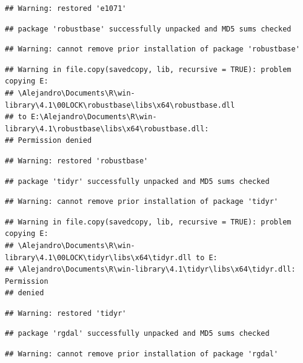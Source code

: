 \documentclass[
  10pt,
]{article}
\begin{document}
\begin{verbatim}
## Warning: restored 'e1071'
\end{verbatim}

\begin{verbatim}
## package 'robustbase' successfully unpacked and MD5 sums checked
\end{verbatim}

\begin{verbatim}
## Warning: cannot remove prior installation of package 'robustbase'
\end{verbatim}

\begin{verbatim}
## Warning in file.copy(savedcopy, lib, recursive = TRUE): problem copying E:
## \Alejandro\Documents\R\win-library\4.1\00LOCK\robustbase\libs\x64\robustbase.dll
## to E:\Alejandro\Documents\R\win-library\4.1\robustbase\libs\x64\robustbase.dll:
## Permission denied
\end{verbatim}

\begin{verbatim}
## Warning: restored 'robustbase'
\end{verbatim}

\begin{verbatim}
## package 'tidyr' successfully unpacked and MD5 sums checked
\end{verbatim}

\begin{verbatim}
## Warning: cannot remove prior installation of package 'tidyr'
\end{verbatim}

\begin{verbatim}
## Warning in file.copy(savedcopy, lib, recursive = TRUE): problem copying E:
## \Alejandro\Documents\R\win-library\4.1\00LOCK\tidyr\libs\x64\tidyr.dll to E:
## \Alejandro\Documents\R\win-library\4.1\tidyr\libs\x64\tidyr.dll: Permission
## denied
\end{verbatim}

\begin{verbatim}
## Warning: restored 'tidyr'
\end{verbatim}

\begin{verbatim}
## package 'rgdal' successfully unpacked and MD5 sums checked
\end{verbatim}

\begin{verbatim}
## Warning: cannot remove prior installation of package 'rgdal'
\end{verbatim}
\end{document}
